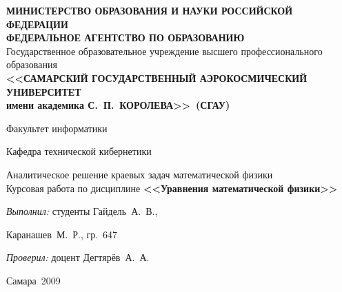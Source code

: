 \begin{titlepage}
\newpage

\begin{center}
\scriptsize
\textbf{МИНИСТЕРСТВО ОБРАЗОВАНИЯ И НАУКИ РОССИЙСКОЙ ФЕДЕРАЦИИ}\\
\textbf{ФЕДЕРАЛЬНОЕ АГЕНТСТВО ПО ОБРАЗОВАНИЮ}\\
Государственное образовательное учреждение высшего профессионального образования\\
\textbf{<<САМАРСКИЙ ГОСУДАРСТВЕННЫЙ АЭРОКОСМИЧЕСКИЙ УНИВЕРСИТЕТ}\\
\textbf{имени академика С.~П.~КОРОЛЕВА>>~(СГАУ)}
\normalsize

\vfill

Факультет информатики

Кафедра технической кибернетики

\vfill
\Large
Аналитическое решение краевых задач математической физики\\
\normalsize
Курсовая работа по дисциплине \textbf{<<Уравнения математической физики>>}
\end{center}

\vfill

\hspace{7cm}\textit{Выполнил:} студенты Гайдель~А.~В.,

\hspace{9cm} Каранашев~М.~Р., гр.~647

\hspace{7cm}\textit{Проверил:} доцент Дегтярёв~А.~А.


\vfill

\begin{center}
Самара~2009
\end{center}
\end{titlepage}